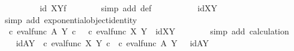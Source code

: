 \begin{isabellebody}
\ \ \ \ \isamarkupfalse%
\ \isamarkupfalse%
\ {\isachardoublequoteopen}{\isachardot}{\kern0pt}{\isachardot}{\kern0pt}{\isachardot}{\kern0pt}\ {\isacharequal}{\kern0pt}\ {\isacharparenleft}{\kern0pt}id\ X{\isacharparenright}{\kern0pt}\isactrlbsup Y\isactrlesup \isactrlsub f{\isachardoublequoteclose}\isanewline
\ \ \ \ \ \ \isamarkupfalse%
\ {\isacharparenleft}{\kern0pt}simp\ add{\isacharcolon}{\kern0pt}\ {\isasympsi}{\isacharunderscore}{\kern0pt}def{\isacharparenright}{\kern0pt}\isanewline
\ \ \ \ \isamarkupfalse%
\ \isamarkupfalse%
\ {\isachardoublequoteopen}{\isachardot}{\kern0pt}{\isachardot}{\kern0pt}{\isachardot}{\kern0pt}\ \ {\isacharequal}{\kern0pt}\ id{\isacharparenleft}{\kern0pt}X\isactrlbsup Y\isactrlesup {\isacharparenright}{\kern0pt}{\isachardoublequoteclose}\isanewline
\ \ \ \ \ \ \isamarkupfalse%
\ {\isacharparenleft}{\kern0pt}simp\ add{\isacharcolon}{\kern0pt}\ exponential{\isacharunderscore}{\kern0pt}object{\isacharunderscore}{\kern0pt}identity{}{\isacharparenright}{\kern0pt}\isanewline
\ \ \ \ \isamarkupfalse%
\ \isamarkupfalse%
\ {\isachardoublequoteopen}{\isacharparenleft}{\kern0pt}{\isasympsi}\ {\isasymcirc}\isactrlsub c\ eval{\isacharunderscore}{\kern0pt}func\ A\ Y{\isacharparenright}{\kern0pt}\isactrlsup {\isasymsharp}\ {\isasymcirc}\isactrlsub c\ \ {\isacharparenleft}{\kern0pt}{\isasymphi}\ {\isasymcirc}\isactrlsub c\ eval{\isacharunderscore}{\kern0pt}func\ X\ Y{\isacharparenright}{\kern0pt}\isactrlsup {\isasymsharp}\ {\isacharequal}{\kern0pt}\ id{\isacharparenleft}{\kern0pt}X\isactrlbsup Y\isactrlesup {\isacharparenright}{\kern0pt}{\isachardoublequoteclose}\isanewline
\ \ \ \ \ \ \isamarkupfalse%
\ {\isacharparenleft}{\kern0pt}simp\ add{\isacharcolon}{\kern0pt}\ calculation{\isacharparenright}{\kern0pt}\isanewline
\ \ \isamarkupfalse%
\isanewline
\ \ \isamarkupfalse%
\ idAY{\isacharcolon}{\kern0pt}\ {\isachardoublequoteopen}{\isacharparenleft}{\kern0pt}{\isasymphi}\ {\isasymcirc}\isactrlsub c\ eval{\isacharunderscore}{\kern0pt}func\ X\ Y{\isacharparenright}{\kern0pt}\isactrlsup {\isasymsharp}\ {\isasymcirc}\isactrlsub c\ {\isacharparenleft}{\kern0pt}{\isasympsi}\ {\isasymcirc}\isactrlsub c\ eval{\isacharunderscore}{\kern0pt}func\ A\ Y{\isacharparenright}{\kern0pt}\isactrlsup {\isasymsharp}\ \ {\isacharequal}{\kern0pt}\ id{\isacharparenleft}{\kern0pt}A\isactrlbsup Y\isactrlesup {\isacharparenright}{\kern0pt}{\isachardoublequoteclose}\isanewline

\end{isabellebody}
